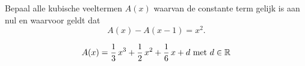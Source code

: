 \documentclass{ximera}
\begin{document}
	\author{Koen De Naeghel - Wiskunde Op Maat}
    \xmsource
	\label{xim:veeltermen_toepassingen_oefeningen_reeks3}

\begin{exercise}
Bepaal alle kubische veeltermen \(A(x)\) waarvan de constante term gelijk is aan nul en waarvoor geldt dat
\[
A(x) - A(x-1) = x^2.
\]

\begin{uitkomst}
$$
A(x) = \frac{1}{3}\,x^3 + \frac{1}{2}\,x^2 + \frac{1}{6}\,x + d \text{ met } d \in \mathbb{R} 
$$
\end{uitkomst}
\end{exercise}
\end{document}
